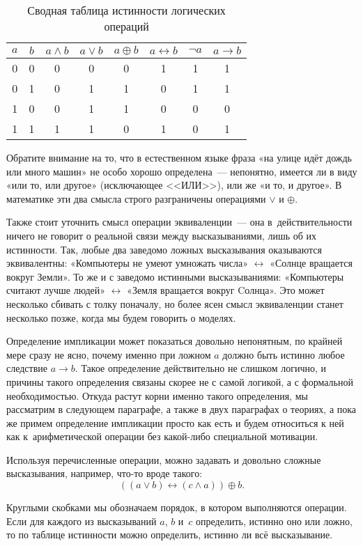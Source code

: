 \begin{table}[h]
\centering
\begin{tabular}{cc|cccccc}
$a$ & $b$ & $a\land b$ & $a\lor b$ & $a\oplus b$ & $a\leftrightarrow b$ & $\neg a$ & $a \to b$\\
\hline
0 & 0 & 0 & 0 & 0 & 1 & 1 & 1 \\
0 & 1 & 0 & 1 & 1 & 0 & 1 & 1 \\
1 & 0 & 0 & 1 & 1 & 0 & 0 & 0 \\
1 & 1 & 1 & 1 & 0 & 1 & 0 & 1
\end{tabular}
\caption{Сводная таблица истинности логических операций}
\end{table}

Обратите внимание на то, что в естественном языке фраза «на улице идёт дождь или много машин» не особо хорошо определена~--- непонятно, имеется ли в виду «или то, или другое» (исключающее <<ИЛИ>>), или же «и то, и другое». В математике эти два смысла строго разграничены операциями $\lor$ и $\oplus$.

Также стоит уточнить смысл операции эквиваленции~--- она в~действительности ничего не говорит о реальной связи между высказываниями, лишь об их истинности. Так, любые два заведомо ложных высказывания оказываются эквивалентны: «Компьютеры не умеют умножать числа» $\leftrightarrow$ «Солнце вращается вок\-руг Земли». То же и с заведомо истинными высказываниями: «Компьютеры считают лучше людей» $\leftrightarrow$ «Земля вращается вок\-руг Cолнца». Это может несколько сбивать с толку поначалу, но более ясен смысл эквиваленции станет несколько позже, когда мы будем говорить о моделях.

Определение импликации может показаться довольно непонятным, по крайней мере сразу не ясно, почему именно при ложном $a$ должно быть истинно любое следствие $a\to b$. Такое определение действительно не слишком логично, и причины такого определения связаны скорее не с самой логикой, а с формальной необходимостью. Откуда растут корни именно такого \mbox{определения,} мы рассматрим в следующем параграфе, а также в двух параграфах о теориях, а пока же примем определение импликации просто как есть и будем относиться к ней как к~арифметической операции без какой-либо специальной мотивации.

Используя перечисленные операции, можно задавать и довольно сложные высказывания, например, что-то вроде такого:
$$
((a \lor b) \leftrightarrow (c \land a)) \oplus b.
$$

Круглыми скобками мы обозначаем порядок, в котором выполняются операции. Если для каждого из высказываний $a$, $b$ и~$c$ определить, истинно оно или ложно, то по таблице истинности можно определить, истинно ли всё высказывание.

